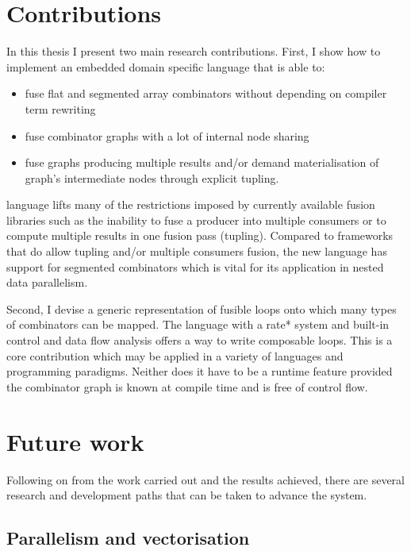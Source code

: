 \documentclass[preamble.tex]{subfiles}
\begin{document}
\section{Contributions}

In this thesis I present two main research contributions. First, I show how to implement an embedded domain specific language that is able to:
\begin{itemize}
  \item fuse flat and segmented array combinators without depending on compiler term rewriting

  \item fuse combinator graphs with a lot of internal node sharing

  \item fuse graphs producing multiple results and/or demand materialisation of graph's intermediate nodes through explicit tupling.
\end{itemize}

\LiveFusion language lifts many of the restrictions imposed by currently available fusion libraries such as the inability to fuse a producer into multiple consumers or to compute multiple results in one fusion pass (tupling). Compared to frameworks that do allow tupling and/or multiple consumers fusion, the new language has support for segmented combinators which is vital for its application in nested data parallelism.

Second, I devise a generic representation of fusible loops onto which many types of combinators can be mapped. The \Loop language with a \*rate* system and built-in control and data flow analysis offers a way to write composable loops. This is a core contribution which may be applied in a variety of languages and programming paradigms. Neither does it have to be a runtime feature provided the combinator graph is known at compile time and is free of control flow.



\section{Future work}

Following on from the work carried out and the results achieved, there are several research and development paths that can be taken to advance the \LiveFusion system.

\subsection{Parallelism and vectorisation}
\end{document}
